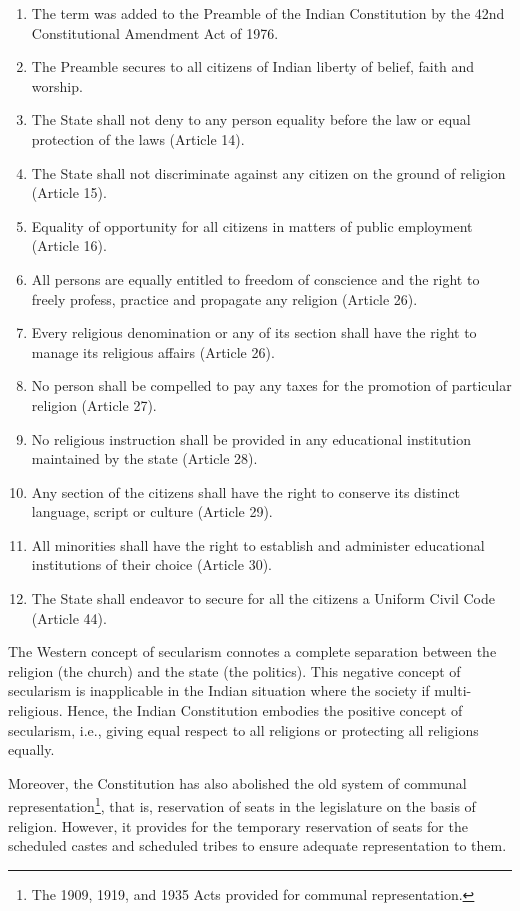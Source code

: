 \renewcommand{\labelenumi}{\textbf{(\alph{enumi})}}
\begin{enumerate}
  \item The term  was added to the Preamble of the Indian Constitution by the 42nd Constitutional Amendment Act of 1976.
  \item The Preamble secures to all citizens of Indian liberty of belief, faith and worship.
  \item The State shall not deny to any person equality before the law or equal protection of the laws (Article 14).
  \item The State shall not discriminate against any citizen on the ground of religion (Article 15).
  \item Equality of opportunity for all citizens in matters of public employment (Article 16).
  \item All persons are equally entitled to freedom of conscience and the right to freely profess, practice and propagate any religion (Article 26).
  \item Every religious denomination or any of its section shall have the right to manage its religious affairs (Article 26).
  \item No person shall be compelled to pay any taxes for the promotion of particular religion (Article 27).
  \item No religious instruction shall be provided in any educational institution maintained by the state (Article 28).
  \item Any section of the citizens shall have the right to conserve its distinct language, script or culture (Article 29).
  \item All minorities shall have the right to establish and administer educational institutions of their choice (Article 30).
  \item The State shall endeavor to secure for all the citizens a Uniform Civil Code (Article 44).
\end{enumerate}

The Western concept of secularism connotes a complete separation between the religion (the church) and the state (the politics). This negative concept of secularism is inapplicable in the Indian situation where the society if multi-religious. Hence, the Indian Constitution embodies the positive concept of secularism, i.e., giving equal respect to all religions or protecting all religions equally.

Moreover, the Constitution has also abolished the old system of communal representation\footnote{The 1909, 1919, and 1935 Acts provided for communal representation.}, that is, reservation of seats in the legislature on the basis of religion. However, it provides for the temporary reservation of seats for the scheduled castes and scheduled tribes to ensure adequate representation to them.

